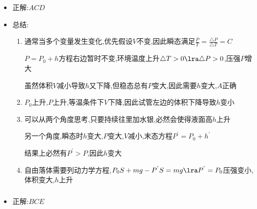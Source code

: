 \documentclass{article}
\begin{document}
\vspace{2em}

\subsubsection{}
\begin{itemize}
    \item 正解:\quad $ACD$
    \item 总结:\quad

          \hspace{3em}\begin{minipage}{0.88\textwidth}
              \begin{enumerate}[label = (\Alph*)]
                  \item 通常当多个变量发生变化,优先假设$V$不变,因此瞬态满足$\frac{P}{T} = \frac{\triangle P}{\triangle T} = C$

                        $P = P_{0} + h$方程右边暂时不变,环境温度上升$\triangle T > 0 \lra \triangle P > 0$,压强$P$增大

                        虽然体积$V$减小导致$h$又下降,但稳态总有$P$变大,因此需要$h$变大,$A$正确
                  \item $P_{0}$上升,$P$上升,等温条件下$V$下降,因此试管左边的体积下降导致$h$变小
                  \item 可以从两个角度思考,只要持续往里加水银,必然会使得液面高$h$上升

                        另一个角度,瞬态时$h$变大,$P$变大,$V$减小,末态方程$P^{'} = P_{0} + h^{'}$

                        结果上必然有$P^{'}>P$,因此$h$变大
                  \item 自由落体需要列动力学方程,$P_{0}S + mg - P^{'}S = mg \lra P^{'} = P_{0}$压强变小,体积变大,$h$上升
              \end{enumerate}
          \end{minipage}
\end{itemize}

\vspace{2em}

\subsubsection{}
\begin{itemize}
    \item 正解:\quad $BCE$
\end{itemize}

\vspace{2em}
\end{document}
